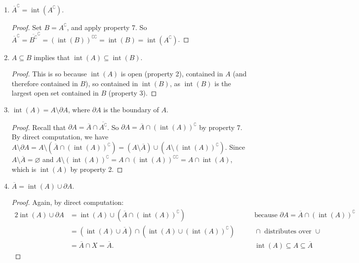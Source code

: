\documentclass[12pt]{article}
\def\int{\operatorname{int}}
\begin{document}
\begin{enumerate}
\begin{proof}
(RHS $\subseteq$ LHS).  If $a\in (\int(A))^\complement$, then $a\notin \int(A)$.  If $B$ is a closed set such that $A^\complement \subseteq B$, then $B^\complement \subseteq A$.  Since $B^\complement$ is open, $B^\complement \subseteq \int(A)$ by property 3, so $a\notin B^\complement$, and thus $a\in B$.  Since $B$ is arbitrary, $a\in \overline{A^\complement}$ as desired.
\end{proof}
\item $\overline{A}^\complement = \int(A^\complement)$.
\begin{proof}  Set $B=A^\complement$, and apply property 7.  So $\overline{A}^\complement = \overline{B^\complement}^\complement = (\int(B))^{\complement\complement}=\int(B)=\int(A^\complement)$.
\end{proof}
\item $A\subseteq B$ implies that $\int(A)\subseteq \int(B)$.
\begin{proof}  This is so because $\int(A)$ is open (property 2), contained in $A$ (and therefore contained in $B$), so contained in $\int(B)$, as $\int(B)$ is the largest open set contained in $B$ (property 3).
\end{proof}
\item $\int(A)=A\setminus \partial A$, where $\partial A$ is the boundary of $A$.
\begin{proof}  Recall that $\partial A=\overline{A}\cap \overline{A^\complement}$.  So $\partial A = \overline{A}\cap (\int(A))^\complement$ by property 7.  By direct computation, we have $A\setminus \partial A = A \setminus (\overline{A}\cap (\int(A))^\complement) = (A\setminus \overline{A})\cup (A\setminus (\int(A))^\complement)$.  Since $A\setminus \overline{A}=\varnothing$ and $A\setminus (\int(A))^\complement = A\cap (\int(A))^{\complement\complement}= A\cap \int(A)$, which is $\int(A)$ by property 2.
\end{proof}
\item $\overline{A} = \int(A)\cup \partial A$.
\begin{proof} Again, by direct computation:
\begin{alignat*}{2}
\int(A)\cup \partial A &= \int(A)\cup (\overline{A}\cap (\int(A))^\complement)& \qquad\mbox{because } \partial A = \overline{A}\cap (\int(A))^\complement \\
 &= (\int(A)\cup \overline{A})\cap (\int(A)\cup (\int(A))^\complement) & \qquad \cap\mbox{ distributes over }\cup \\
&=\overline{A}\cap X=\overline{A}.& \qquad \int(A)\subseteq A\subseteq \overline{A}

\end{alignat*}
\end{proof}
\end{enumerate}
\end{document}
